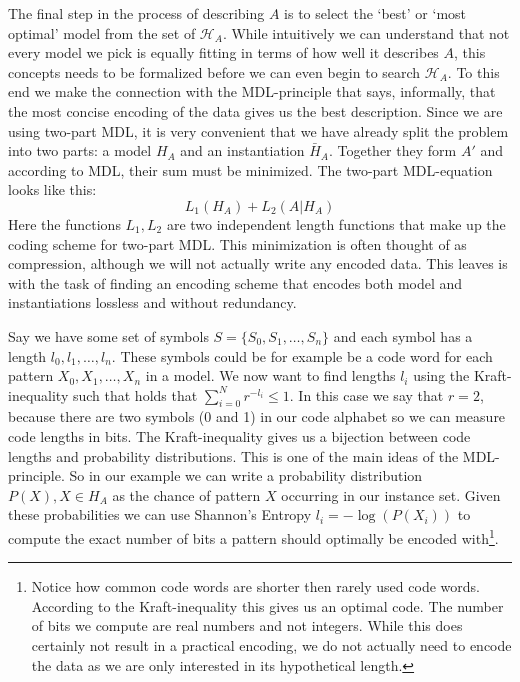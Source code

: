 \documentclass[a4paper,notoc,oneside]{tufte-book}
\begin{document}
The final step in the process of describing $A$ is to select the `best' or `most optimal' model from the set of $\mathcal{H}_A$. While intuitively we can understand that not every model we pick is equally fitting in terms of how well it describes $A$, this concepts needs to be formalized before we can even begin to search $\mathcal{H}_A$. To this end we make the connection with the MDL-principle that says, informally, that the most concise encoding of the data gives us the best description. Since we are using two-part MDL, it is very convenient that we have already split the problem into two parts:  a model $H_A$ and an instantiation $\bar{H}_A$. Together they form $A'$ and according to MDL, their sum must be minimized. The two-part MDL-equation looks like this:
$$
L_1(H_A) + L_2(A|H_A)
$$
Here the functions $L_1, L_2$ are two independent length functions that make up the coding scheme for two-part MDL. This minimization is often thought of as compression, although we will not actually write any encoded data. This leaves is with the task of finding an encoding scheme that encodes both model and instantiations lossless and without redundancy.

Say we have some set of symbols $S=\{S_0,S_1,\dots,S_n\}$ and each symbol has a length $l_0,l_1,\dots,l_n$. These symbols could be for example be a code word for each pattern $X_0, X_1,\dots,X_n$ in a model. We now want to find lengths $l_i$ using the Kraft-inequality such that holds that $\displaystyle\sum^N_{i=0}r^{-l_i} \leq 1$. In this case we say that $r=2$, because there are two symbols (0 and 1) in our code alphabet so we can measure code lengths in bits. 
The Kraft-inequality gives us a bijection between code lengths and probability distributions. This is one of the main ideas of the MDL-principle. So in our example we can write a probability distribution $P(X), X \in H_A$ as the chance of pattern $X$ occurring in our instance set. Given these probabilities we can use Shannon's Entropy $l_i=-\log(P(X_i))$ to compute the exact number of bits a pattern should optimally be encoded with\footnote[][-5cm]{Notice how common code words are shorter then rarely used code words. According to the Kraft-inequality this gives us an optimal code. The number of bits we compute are real numbers and not integers. While this does certainly not result in a practical encoding, we do not actually need to encode the data as we are only interested in its hypothetical length.}.
\end{document}
